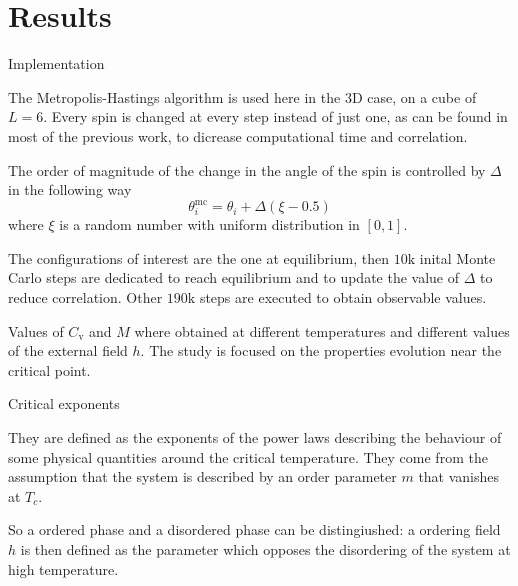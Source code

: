 \documentclass{beamer}
\begin{document}
\section{Results}

\begin{frame}{Implementation}

The Metropolis-Hastings algorithm is used here in the 3D case, on a cube of $L=6$.
Every spin is changed at every step instead of just one, as can be found in most 
of the previous work, to dicrease computational time and correlation.

\vspace{3mm}

The order of magnitude of the change in the angle of the spin is controlled by
$\Delta$ in the following way
\begin{equation}
\theta_i^{\text{mc}} = \theta_i + \Delta (\xi - 0.5)
\end{equation}
where $\xi$ is a random number with uniform distribution in $[0,1]$.

\end{frame}

\begin{frame}

The configurations of interest are the one at equilibrium, then $10\text{k}$ 
inital Monte Carlo steps are dedicated to reach equilibrium and to update the
value of $\Delta$ to reduce correlation. Other $190\text{k}$ steps are executed to
obtain observable values.

\vspace{5mm}

Values of $C_{\text{v}}$ and $M$ where obtained at different temperatures and different
values of the external field $h$. The study is focused on the properties evolution
near the critical point.

\end{frame}

\begin{frame}{Critical exponents}

They are defined as the exponents of the power laws describing the behaviour of 
some physical quantities around the critical temperature. They come from the
assumption that the system is described by an order parameter $m$ that vanishes at
$T_c$.

\vspace{5mm}

So a ordered phase and a disordered phase can be distingiushed: a ordering field
$h$ is then defined as the parameter which opposes the disordering of the system
at high temperature.
\end{frame}
\end{document}
